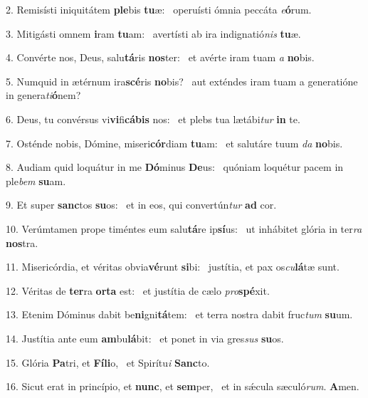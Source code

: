 2. Remisísti iniquitátem \textbf{ple}bis \textbf{tu}æ: \ast\  operuísti ómnia peccáta \textit{e}\textbf{ó}rum.\

3. Mitigásti omnem \textbf{i}ram \textbf{tu}am: \ast\  avertísti ab ira indignatió\textit{nis} \textbf{tu}æ.\

4. Convérte nos, Deus, salu\textbf{tá}ris \textbf{nos}ter: \ast\  et avérte iram tuam \textit{a} \textbf{no}bis.\

5. Numquid in ætérnum ira\textbf{scé}ris \textbf{no}bis? \ast\  aut exténdes iram tuam a generatióne in genera\textit{ti}\textbf{ó}nem?\

6. Deus, tu convérsus vi\textbf{vi}fi\textbf{cá}\textbf{bis} nos: \ast\  et plebs tua lætábi\textit{tur} \textbf{in} te.\

7. Osténde nobis, Dómine, miseri\textbf{cór}diam \textbf{tu}am: \ast\  et salutáre tuum \textit{da} \textbf{no}bis.\

8. Audiam quid loquátur in me \textbf{Dó}minus \textbf{De}us: \ast\  quóniam loquétur pacem in ple\textit{bem} \textbf{su}am.\

9. Et super \textbf{sanc}tos \textbf{su}os: \ast\  et in eos, qui convertún\textit{tur} \textbf{ad} cor.\

10. Verúmtamen prope timéntes eum salu\textbf{tá}re ip\textbf{sí}us: \ast\  ut inhábitet glória in ter\textit{ra} \textbf{nos}tra.\

11. Misericórdia, et véritas obvia\textbf{vé}runt \textbf{si}bi: \ast\  justítia, et pax os\textit{cu}\textbf{lá}tæ sunt.\

12. Véritas de \textbf{ter}ra \textbf{or}\textbf{ta} est: \ast\  et justítia de cælo \textit{pro}\textbf{spé}xit.\

13. Etenim Dóminus dabit be\textbf{ni}gni\textbf{tá}tem: \ast\  et terra nostra dabit fruc\textit{tum} \textbf{su}um.\

14. Justítia ante eum \textbf{am}bu\textbf{lá}bit: \ast\  et ponet in via gres\textit{sus} \textbf{su}os.\

15. Glória \textbf{Pa}tri, et \textbf{Fí}\textbf{li}o, \ast\  et Spirítu\textit{i} \textbf{Sanc}to.\

16. Sicut erat in princípio, et \textbf{nunc}, et \textbf{sem}per, \ast\  et in sǽcula sæculó\textit{rum}. \textbf{A}men.\


